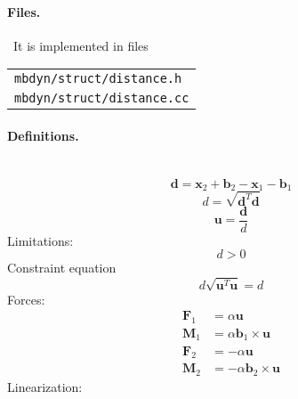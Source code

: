 \documentclass[10pt,fleqn,subeqn]{report}
\newcommand{\T}[1]{\bm{#1}}
\begin{document}
\paragraph{Files.} \
It is implemented in files

\begin{tabular}{l}
\texttt{mbdyn/struct/distance.h} \\
\texttt{mbdyn/struct/distance.cc}
\end{tabular}

\paragraph{Definitions.} \
\begin{equation}
	\T{d} = \T{x}_2 + \T{b}_2 - \T{x}_1 - \T{b}_1
\end{equation}
\begin{equation}
	d = \sqrt{\T{d}^T \T{d}}
\end{equation}
\begin{equation}
	\T{u} = \frac{\T{d}}{d}
\end{equation}
Limitations:
\begin{equation}
	d > 0
\end{equation}
Constraint equation 
\begin{equation}
	d \sqrt{\T{u}^T \T{u}} = d
\end{equation}
Forces:
\begin{subequations}
\begin{align}
	\T{F}_1 &= \alpha \T{u} \\
	\T{M}_1 &= \alpha \T{b}_1 \times \T{u} \\
	\T{F}_2 &= -\alpha \T{u} \\
	\T{M}_2 &= -\alpha \T{b}_2 \times \T{u}
\end{align}
\end{subequations}
Linearization:
\end{document}
